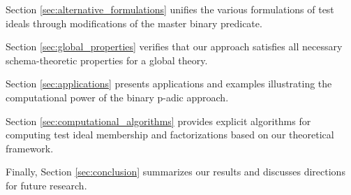 Section \ref{sec:alternative_formulations} unifies the various formulations of test ideals through modifications of the master binary predicate.

Section \ref{sec:global_properties} verifies that our approach satisfies all necessary schema-theoretic properties for a global theory.

Section \ref{sec:applications} presents applications and examples illustrating the computational power of the binary p-adic approach.

Section \ref{sec:computational_algorithms} provides explicit algorithms for computing test ideal membership and factorizations based on our theoretical framework.

Finally, Section \ref{sec:conclusion} summarizes our results and discusses directions for future research. 